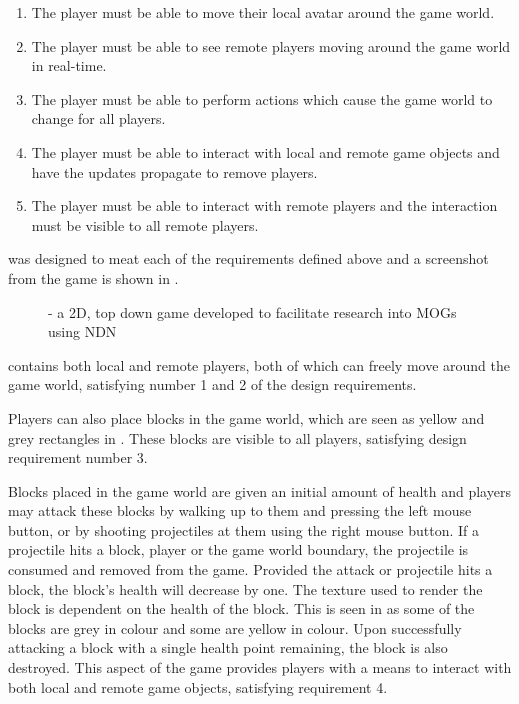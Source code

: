 \begin{enumerate}
    \item The player must be able to move their local avatar around the game world.
    \item The player must be able to see remote players moving around the game world in real-time.
    \item The player must be able to perform actions which cause the game world to change for all players.
    \item The player must be able to interact with local and remote game objects and have the updates propagate to remove players.
    \item The player must be able to interact with remote players and the interaction must be visible to all remote players.
\end{enumerate}

\game{} was designed to meat each of the requirements defined above and a screenshot from the game is shown in .

\begin{figure}[H]
    \centering
    \caption{\game{} - a 2D, top down game developed to facilitate research into MOGs using NDN}
    \label{fig:des:2d-game}
\end{figure}

\game{} contains both local and remote players, both of which can freely move around the game world, satisfying number 1 and 2 of the design requirements.

Players can also place blocks in the game world, which are seen as yellow and grey rectangles in . These blocks are visible to all players, satisfying design requirement number 3.

Blocks placed in the game world are given an initial amount of health and players may attack these blocks by walking up to them and pressing the left mouse button, or by shooting projectiles at them using the right mouse button. If a projectile hits a block, player or the game world boundary, the projectile is consumed and removed from the game. Provided the attack or projectile hits a block, the block's health will decrease by one. The texture used to render the block is dependent on the health of the block. This is seen in  as some of the blocks are grey in colour and some are yellow in colour. Upon successfully attacking a block with a single health point remaining, the block is also destroyed. This aspect of the game provides players with a means to interact with both local and remote game objects, satisfying requirement 4.

